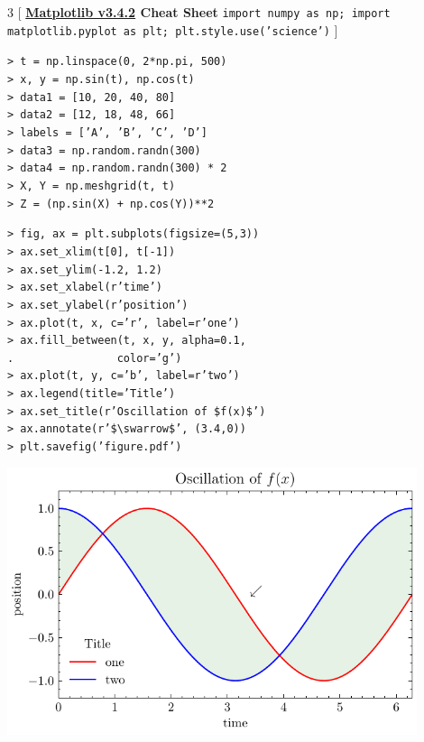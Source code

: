 \documentclass[8pt,a4paper,notitlepage]{scrartcl}
\newcommand{\codebox}[2]{\begin{tcolorbox}[
  colback=boxBG,
  colframe=boxFrame,
  coltitle=mainFont,
  coltext=mainFont,
  left=1pt,
  right=1pt,
  top=1pt,
  bottom=1pt,
  bottomtitle=0mm,
  toptitle=0mm,
  title=\textbf{#1},
  halign title=left, 
  after={\par}]
#2
\end{tcolorbox}}
\begin{document}
\color{mainFont}

\begin{multicols}{3}
[
{\noindent\LARGE \textbf{\href{https://matplotlib.org/}{Matplotlib v3.4.2} Cheat Sheet}} \qquad\texttt{import numpy as np; import matplotlib.pyplot as plt; plt.style.use('science')}
]

\codebox{Preparing the Data}{
\color{codeFont}
\texttt{> t = np.linspace(0, 2*np.pi, 500) \\
> x, y = np.sin(t), np.cos(t) \\
> data1 = [10, 20, 40, 80] \\
> data2 = [12, 18, 48, 66] \\
> labels = ['A', 'B', 'C', 'D'] \\
> data3 = np.random.randn(300) \\
> data4 = np.random.randn(300) * 2 \\
> X, Y = np.meshgrid(t, t) \\
> Z = (np.sin(X) + np.cos(Y))**2
}
\color{mainFont}
}

\codebox{Single 2D Line Plot}{
\color{codeFont}
\texttt{> fig, ax = plt.subplots(figsize=(5,3)) \\
> ax.set\_xlim(t[0], t[-1]) \\
> ax.set\_ylim(-1.2, 1.2) \\
> ax.set\_xlabel(r'time') \\
> ax.set\_ylabel(r'position') \\
> ax.plot(t, x, c='r', label=r'one') \\
> ax.fill\_between(t, x, y, alpha=0.1, \\
. \ \ \ \ \ \ \ \ \ \ \ \ \ \ \ color='g') \\
> ax.plot(t, y, c='b', label=r'two') \\
> ax.legend(title='Title') \\
> ax.set\_title(r'Oscillation of \$f(x)\$') \\
> ax.annotate(r'\$\textbackslash swarrow\$', (3.4,0)) \\
> plt.savefig('figure.pdf')
}
\color{mainFont}
\begin{center}
	\includegraphics[width=0.9\textwidth]{fig-single.pdf}
\end{center}
}


\end{multicols}
\end{document}
